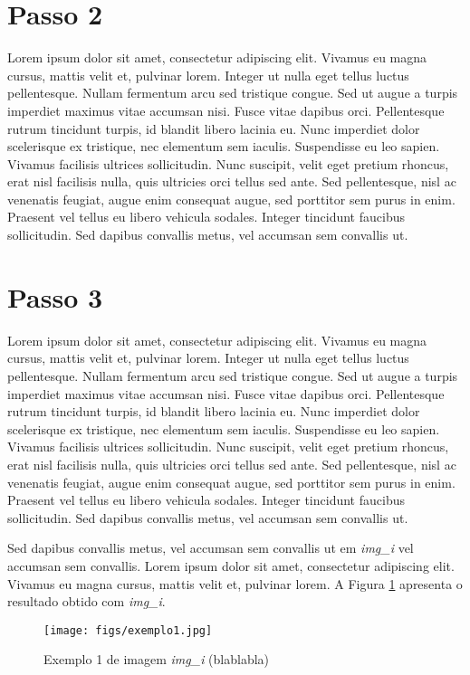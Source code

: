 \section{Passo 2}

Lorem ipsum dolor sit amet, consectetur adipiscing elit. Vivamus eu magna cursus, mattis velit et, pulvinar lorem. Integer ut nulla eget tellus luctus pellentesque. Nullam fermentum arcu sed tristique congue. Sed ut augue a turpis imperdiet maximus vitae accumsan nisi. Fusce vitae dapibus orci. Pellentesque rutrum tincidunt turpis, id blandit libero lacinia eu. Nunc imperdiet dolor scelerisque ex tristique, nec elementum sem iaculis. Suspendisse eu leo sapien. Vivamus facilisis ultrices sollicitudin. Nunc suscipit, velit eget pretium rhoncus, erat nisl facilisis nulla, quis ultricies orci tellus sed ante. Sed pellentesque, nisl ac venenatis feugiat, augue enim consequat augue, sed porttitor sem purus in enim. Praesent vel tellus eu libero vehicula sodales. Integer tincidunt faucibus sollicitudin. Sed dapibus convallis metus, vel accumsan sem convallis ut.

\section{Passo 3}

Lorem ipsum dolor sit amet, consectetur adipiscing elit. Vivamus eu magna cursus, mattis velit et, pulvinar lorem. Integer ut nulla eget tellus luctus pellentesque. Nullam fermentum arcu sed tristique congue. Sed ut augue a turpis imperdiet maximus vitae accumsan nisi. Fusce vitae dapibus orci. Pellentesque rutrum tincidunt turpis, id blandit libero lacinia eu. Nunc imperdiet dolor scelerisque ex tristique, nec elementum sem iaculis. Suspendisse eu leo sapien. Vivamus facilisis ultrices sollicitudin. Nunc suscipit, velit eget pretium rhoncus, erat nisl facilisis nulla, quis ultricies orci tellus sed ante. Sed pellentesque, nisl ac venenatis feugiat, augue enim consequat augue, sed porttitor sem purus in enim. Praesent vel tellus eu libero vehicula sodales. Integer tincidunt faucibus sollicitudin. Sed dapibus convallis metus, vel accumsan sem convallis ut.

Sed dapibus convallis metus, vel accumsan sem convallis ut em \textit{img\_i} vel accumsan sem convallis. Lorem ipsum dolor sit amet, consectetur adipiscing elit. Vivamus eu magna cursus, mattis velit et, pulvinar lorem. A Figura \ref{fig:figura_1} apresenta o resultado obtido com \textit{img\_i}.

\begin{figure}[htbp!]
  \centering
  \caption{Exemplo 1 de imagem \textit{img\_i} (blablabla)}
  \texttt{[image: figs/exemplo1.jpg]}
    \label{fig:figura_1}
\end{figure}

